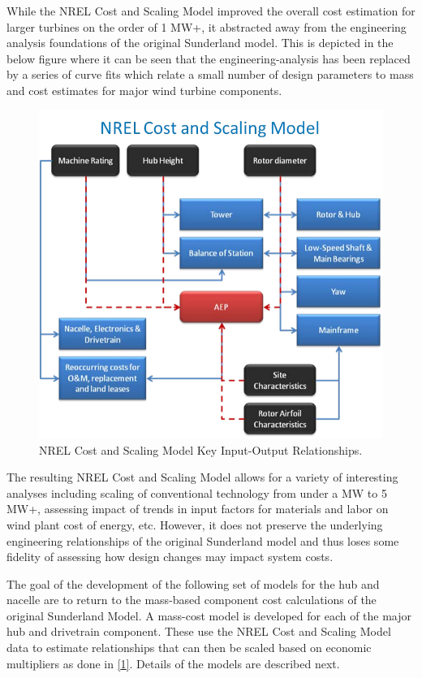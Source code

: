 \documentclass[letterpaper,10pt,openany,oneside]{sphinxmanual}
\begin{document}
While the NREL Cost and Scaling Model improved the overall cost estimation for larger turbines on the order of 1 MW+, it abstracted away from the engineering analysis foundations of the original Sunderland model.  This is depicted in the below figure where it can be seen that the engineering-analysis has been replaced by a series of curve fits which relate a small number of design parameters to mass and cost estimates for major wind turbine components.
\begin{figure}[htbp]
\centering
\capstart

\includegraphics[width=5.5in]{NRELCSM.pdf}
\caption{NREL Cost and Scaling Model Key Input-Output Relationships.}\label{theory:nrelcsm}\end{figure}

The resulting NREL Cost and Scaling Model allows for a variety of interesting analyses including scaling of conventional technology from under a MW to 5 MW+, assessing impact of trends in input factors for materials and labor on wind plant cost of energy, etc.  However, it does not preserve the underlying engineering relationships of the original Sunderland model and thus loses some fidelity of assessing how design changes may impact system costs.

The goal of the development of the following set of models for the hub and nacelle are to return to the mass-based component cost calculations of the original Sunderland Model.  A mass-cost model is developed for each of the major hub and drivetrain component.  These use the NREL Cost and Scaling Model data to estimate relationships that can then be scaled based on economic multipliers as done in {\hyperref[theory:1]{{[}1{]}}}.  Details of the models are described next.
\end{document}
